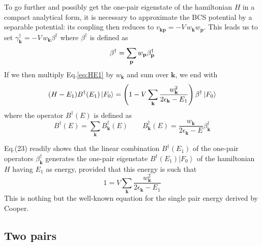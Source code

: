 \documentclass[aps,prb,superscriptaddress,twocolumn]{revtex4}
\newcommand{\vk}{\ensuremath{\mathbf{k}}}
\newcommand{\vp}{\ensuremath{\mathbf{p}}}
\begin{document}
To go further and possibly get the one-pair eigenstate of the hamiltonian $H$
in a compact analytical form, it is necessary to approximate the BCS potential by a separable potential: its
coupling then reduces to $v_{\mathbf{k} \mathbf{p} }=-V\,w_\vk{}w_\vp$.
This leads us to set $\gamma^{\dagger}_\vk=-V\,w_\vk\beta^{\dagger}$ where $\beta^{\dagger}$ is defined as 
\begin{equation}  \label{eq:gammaBeta}
\beta^{\dagger}=\sum_%
\vp{}w_\vp\beta^{\dagger}_\vp
\end{equation}
If we then multiply Eq.\eqref{eq:HE1} by $w_\vk$ and sum over $\mathbf{k} $,
we end with 
\begin{equation}
(H-E _1)B^{\dagger}(E _1)\left|F_0\right>  =\left(1-V\sum_\vk{%
\frac{w_\vk^2}{2\epsilon_\vk-E _1}}\right)
\beta^{\dagger}\left|F_0\right>  
\end{equation}
where the operator $B^{\dagger}(E)$ is defined as  
\begin{equation}  \label{eq:B}
B^{\dagger}(E)=\sum_\vk{B_\vk^{\dagger}(E)}\quad\quad B_\vk^{\dagger}(E)=\frac{w_\vk}{2\epsilon_\vk-E}\beta^{\dagger}_\vk
\end{equation}

Eq.(23) readily shows that the linear combination $B^{\dagger}(E _1)
$ of the one-pair operators $\beta^{\dagger}_\vk$ generates the one-pair eigenstate $B^{\dagger}(%
E _1)\left|F_0\right>  $ of the hamiltonian $H$ having  $%
E _1$ as energy, provided that this energy is such that 
\begin{equation}  \label{eq:SchOne}
1=V\sum_\vk{\frac{w_\vk^2}{2\epsilon_\vk-E _1}}
\end{equation}
This is nothing but the well-known equation for the single pair energy
derived by Cooper.

\subsection{Two pairs}
\end{document}
